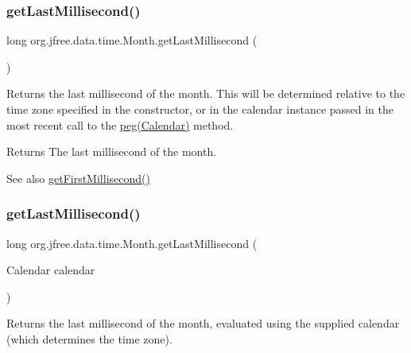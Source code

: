 \subsubsection{\texorpdfstring{get\+Last\+Millisecond()}{getLastMillisecond()}\hspace{0.1cm}{\footnotesize\ttfamily [1/2]}}
{\footnotesize\ttfamily long org.\+jfree.\+data.\+time.\+Month.\+get\+Last\+Millisecond (\begin{DoxyParamCaption}{ }\end{DoxyParamCaption})}

Returns the last millisecond of the month. This will be determined relative to the time zone specified in the constructor, or in the calendar instance passed in the most recent call to the \mbox{\hyperlink{classorg_1_1jfree_1_1data_1_1time_1_1_month_aabe5e5b144b7404d24109c8bee8c5519}{peg(\+Calendar)}} method.

\begin{DoxyReturn}{Returns}
The last millisecond of the month.
\end{DoxyReturn}
\begin{DoxySeeAlso}{See also}
\mbox{\hyperlink{classorg_1_1jfree_1_1data_1_1time_1_1_month_a87e8e3a27514d0290c33041eed3b1a83}{get\+First\+Millisecond()}} 
\end{DoxySeeAlso}
\mbox{\label{classorg_1_1jfree_1_1data_1_1time_1_1_month_af95f6d9661ea0175063ae3387d160512}} 
\subsubsection{\texorpdfstring{get\+Last\+Millisecond()}{getLastMillisecond()}\hspace{0.1cm}{\footnotesize\ttfamily [2/2]}}
{\footnotesize\ttfamily long org.\+jfree.\+data.\+time.\+Month.\+get\+Last\+Millisecond (\begin{DoxyParamCaption}\item[{Calendar}]{calendar }\end{DoxyParamCaption})}

Returns the last millisecond of the month, evaluated using the supplied calendar (which determines the time zone).



